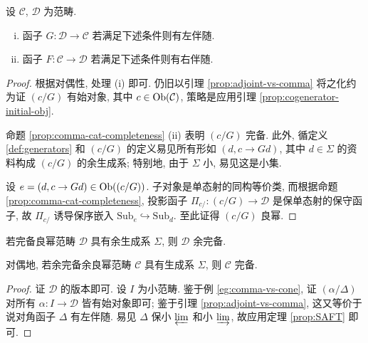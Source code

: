 \begin{theorem}[特殊伴随函子定理]\label{prop:SAFT}
	设 $\mathcal{C}$, $\mathcal{D}$ 为范畴.
	\begin{enumerate}[(i)]
		\item 函子 $G: \mathcal{D} \to \mathcal{C}$ 若满足下述条件则有左伴随.
		\item 函子 $F: \mathcal{C} \to \mathcal{D}$ 若满足下述条件则有右伴随.
	\end{enumerate}
\end{theorem}
\begin{proof}
	根据对偶性, 处理 (i) 即可. 仍旧以引理 \ref{prop:adjoint-vs-comma} 将之化约为证 $(c/G)$ 有始对象, 其中 $c \in \operatorname{Ob}(\mathcal{C})$, 策略是应用引理 \ref{prop:cogenerator-initial-obj}.
	
	命题 \ref{prop:comma-cat-completeness} (ii) 表明 $(c/G)$ 完备. 此外, 循定义 \ref{def:generators} 和 $(c/G)$ 的定义易见所有形如 $(d, c \to Gd)$, 其中 $d \in \Sigma$ 的资料构成 $(c/G)$ 的余生成系; 特别地, 由于 $\Sigma$ 小, 易见这是小集.
	
	设 $e = (d, c \to Gd) \in \operatorname{Ob}((c/G))$. 子对象是单态射的同构等价类, 而根据命题 \ref{prop:comma-cat-completeness}, 投影函子 $\Pi_{c/}: (c/G) \to \mathcal{D}$ 是保单态射的保守函子, 故 $\Pi_{c/}$ 诱导保序嵌入 $\mathrm{Sub}_e \hookrightarrow \mathrm{Sub}_d$. 至此证得 $(c/G)$ 良幂.
\end{proof}

\begin{corollary}\label{prop:SAFT-completeness}
	若完备良幂范畴 $\mathcal{D}$ 具有余生成系 $\Sigma$, 则 $\mathcal{D}$ 余完备.
	
	对偶地, 若余完备余良幂范畴 $\mathcal{C}$ 具有生成系 $\Sigma$, 则 $\mathcal{C}$ 完备.
\end{corollary}
\begin{proof}
	证 $\mathcal{D}$ 的版本即可. 设 $I$ 为小范畴. 鉴于例 \ref{eg:comma-vs-cone}, 证 $(\alpha/\Delta)$ 对所有 $\alpha: I \to \mathcal{D}$ 皆有始对象即可; 鉴于引理 \ref{prop:adjoint-vs-comma}, 这又等价于说对角函子 $\Delta$ 有左伴随. 易见 $\Delta$ 保小 $\varprojlim$ 和小 $\varinjlim$, 故应用定理 \ref{prop:SAFT} 即可.
\end{proof}


